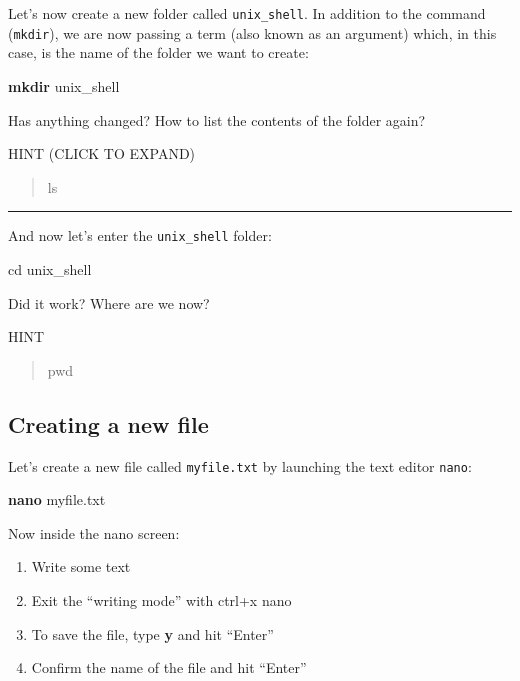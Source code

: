 \documentclass[
]{book}
\newenvironment{Shaded}{\begin{snugshade}}{\end{snugshade}}
\newcommand{\BuiltInTok}[1]{#1}
\newcommand{\FunctionTok}[1]{\textcolor[rgb]{0.13,0.29,0.53}{\textbf{#1}}}
\newcommand{\NormalTok}[1]{#1}
\begin{document}
Let's now create a new folder called \texttt{unix\_shell}. In addition to the command (\texttt{mkdir}), we are now passing a term (also known as an argument) which, in this case, is the name of the folder we want to create:

\begin{Shaded}
\begin{Highlighting}[]
\FunctionTok{mkdir}\NormalTok{ unix\_shell}
\end{Highlighting}
\end{Shaded}

Has anything changed? How to list the contents of the folder again?

HINT (CLICK TO EXPAND)

\begin{quote}
ls
\end{quote}

\begin{center}\rule{0.5\linewidth}{0.5pt}\end{center}

And now let's enter the \texttt{unix\_shell} folder:

\begin{Shaded}
\begin{Highlighting}[]
\BuiltInTok{cd}\NormalTok{ unix\_shell}
\end{Highlighting}
\end{Shaded}

Did it work? Where are we now?

HINT

\begin{quote}
pwd
\end{quote}

\hypertarget{creating-a-new-file}{%
\subsection{Creating a new file}\label{creating-a-new-file}}

Let's create a new file called \texttt{myfile.txt} by launching the text editor \texttt{nano}:

\begin{Shaded}
\begin{Highlighting}[]
\FunctionTok{nano}\NormalTok{ myfile.txt}
\end{Highlighting}
\end{Shaded}

Now inside the nano screen:

\begin{enumerate}
\def\labelenumi{\arabic{enumi}.}
\item
  Write some text
\item
  Exit the ``writing mode'' with ctrl+x
  nano
\item
  To save the file, type \textbf{y} and hit ``Enter''
\item
  Confirm the name of the file and hit ``Enter''
\end{enumerate}
\end{document}
